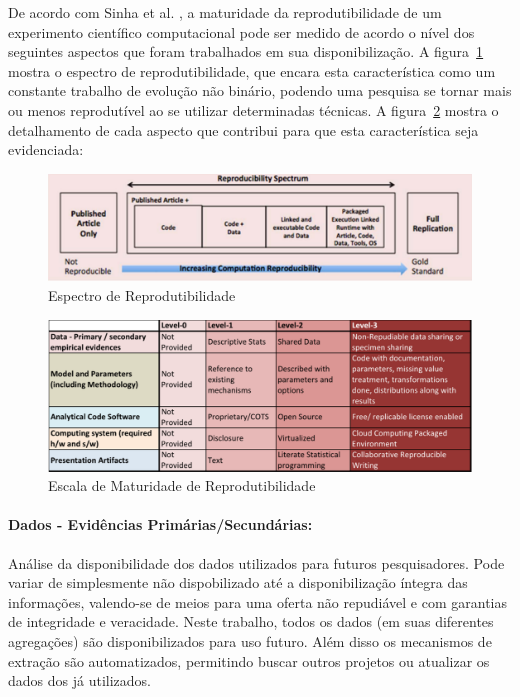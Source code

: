 \documentclass[a4paper,12pt]{monografia}
\theoremstyle{plain}
\theoremstyle{definition}
\theoremstyle{remark}
\begin{document}
De acordo com Sinha et al. \cite{sinha2016}, a maturidade da reprodutibilidade de um experimento científico computacional pode ser medido de acordo o nível dos seguintes aspectos que foram trabalhados em sua disponibilização. A figura~\ref{fig:espectro_reprodutibilidade} mostra o espectro de reprodutibilidade, que encara esta característica como um constante trabalho de evolução não binário, podendo uma pesquisa se tornar mais ou menos reprodutível ao se utilizar determinadas técnicas. A figura~\ref{fig:escala_reprodutibilidade} mostra o detalhamento de cada aspecto que contribui para que esta característica seja evidenciada:

\begin{figure}[!htbp]
 \includegraphics[width=\textwidth]{espectro_reprodutibilidade}
 \caption{Espectro de Reprodutibilidade}\label{fig:espectro_reprodutibilidade}
\end{figure}

\begin{figure}[!htbp]
 \includegraphics[width=\textwidth]{escala_reprodutibilidade}
 \caption{Escala de Maturidade de Reprodutibilidade}\label{fig:escala_reprodutibilidade}
\end{figure}


\paragraph{Dados - Evidências Primárias/Secundárias:} Análise da disponibilidade dos dados utilizados para futuros pesquisadores. Pode variar de simplesmente não dispobilizado até a disponibilização íntegra das informações, valendo-se de meios para uma oferta não repudiável e com garantias de integridade e veracidade. Neste trabalho, todos os dados (em suas diferentes agregações) são disponibilizados para uso futuro. Além disso os mecanismos de extração são automatizados, permitindo buscar outros projetos ou atualizar os dados dos já utilizados.
\end{document}
